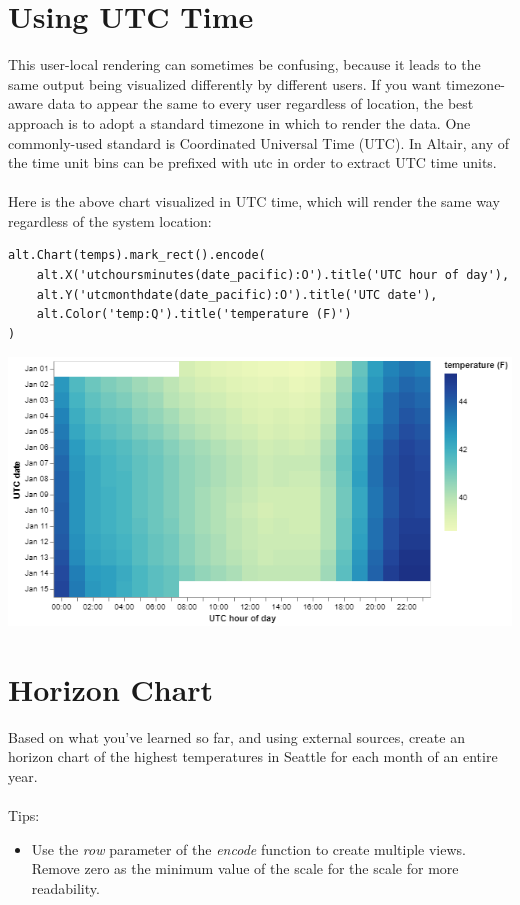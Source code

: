 \documentclass[11pt]{article}
\begin{document}
\section{Using UTC Time}

This user-local rendering can sometimes be confusing, because it leads to the same output being visualized differently by different users. If you want timezone-aware data to appear the same to every user regardless of location, the best approach is to adopt a standard timezone in which to render the data. One commonly-used standard is Coordinated Universal Time (UTC). In Altair, any of the time unit bins can be prefixed with utc in order to extract UTC time units.\\
\\
Here is the above chart visualized in UTC time, which will render the same way regardless of the system location:

\begin{verbatim}
alt.Chart(temps).mark_rect().encode(
    alt.X('utchoursminutes(date_pacific):O').title('UTC hour of day'),
    alt.Y('utcmonthdate(date_pacific):O').title('UTC date'),
    alt.Color('temp:Q').title('temperature (F)')
)
\end{verbatim}

\begin{center}
\includegraphics[width=.7\textwidth]{visualization (6).png}
\end{center}

\section{Horizon Chart}

Based on what you've learned so far, and using external sources, create an horizon chart of the highest temperatures in Seattle for each month of an entire year.\\
\\
Tips:
\begin{itemize}
    \item Use the \textit{row} parameter of the \textit{encode} function to create multiple views.
    \itme Remove zero as the minimum value of the scale for the scale for more readability.
\end{itemize}
\end{document}
